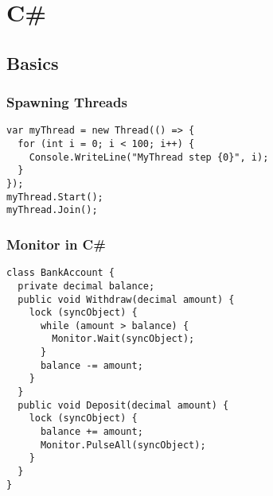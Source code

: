 \documentclass[main.tex,fontsize=8pt,paper=a4,paper=portrait,DIV=calc,]{scrartcl}
\begin{document}
\section{C\#}

\subsection{Basics}

\subsubsection{Spawning Threads}
\begin{lstlisting}
var myThread = new Thread(() => {
  for (int i = 0; i < 100; i++) {
    Console.WriteLine("MyThread step {0}", i);
  }
});
myThread.Start();
myThread.Join();
\end{lstlisting}

\subsubsection{Monitor in C\#}
\begin{lstlisting}
class BankAccount {
  private decimal balance;
  public void Withdraw(decimal amount) {
    lock (syncObject) {
      while (amount > balance) {
        Monitor.Wait(syncObject);
      }
      balance -= amount;
    }
  }
  public void Deposit(decimal amount) {
    lock (syncObject) {
      balance += amount;
      Monitor.PulseAll(syncObject);
    }
  }
}
\end{lstlisting}
\end{document}
